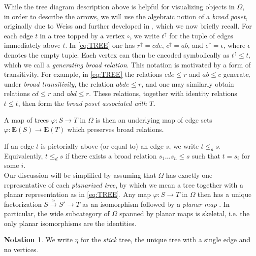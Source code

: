 \documentclass[a4paper,10pt]{article}%
\numberwithin{equation}{section}
\numberwithin{figure}{section}
\theoremstyle{definition} %
\newtheorem{notation}[equation]{Notation}%
\begin{document}
While the tree diagram description above is helpful for visualizing objects in $\Omega$,
in order to describe the arrows,
we will use the algebraic notion of
a \emph{broad poset},
originally due to Weiss \cite{Wei12}
and further developed in \cite{Per18},
which we now briefly recall.
%
For each edge $t$ in a tree topped by a vertex $\circ$, we write
$t^{\uparrow}$
for the tuple of edges immediately above $t$.
In \eqref{eq:TREE} one has  
$r^{\uparrow} = cde$, 
$c^\uparrow = ab$, 
and $e^\uparrow = \epsilon$,
where $\epsilon$ denotes the empty tuple.
Each vertex can then be encoded symbolically as
$t^{\uparrow} \leq t$,
which we call a 
\emph{generating broad relation}.
This notation is motivated by a form of transitivity.
For example,
in \eqref{eq:TREE}
the relations
$cde \leq r$ and $ab \leq c$
generate, under \emph{broad transitivity},
the relation $abde \leq r$,
and one may similarly obtain relations
$cd \leq r$ and $abd \leq r$.
These relations, together with identity relations $t \leq t$,
then form the \emph{broad poset associated with $T$}.


A map of trees $\varphi \colon S \to T$
in $\Omega$ is then an underlying map
of edge sets 
$\varphi \colon \boldsymbol{E}(S) \to \boldsymbol{E}(T)$
which preserves broad relations.

If an edge $t$ is pictorially above (or equal to) an edge $s$, we write $t \leq_d s$.
Equivalently, $t \leq_d s$ if there exists a broad relation $s_1\dots s_n \leq s$ such that $t = s_i$ for some $i$.\\

Our discussion will be simplified by assuming 
that $\Omega$ has exactly one representative of 
each \emph{planarized tree},
by which we mean a tree together with a planar representation as in \eqref{eq:TREE}.
Any map  
$\varphi \colon S \to T$ in $\Omega$
then has a unique factorization
$S \xrightarrow{\simeq} S' \to T$
as an isomorphism followed by a \emph{planar map}
\cite[Prop. 3.24]{BP_geo}.
In particular, the wide subcategory of $\Omega$ spanned by planar maps is skeletal,
i.e. the only planar isomorphisms are the identities.




\begin{notation}
	We write $\eta$ for the \textit{stick} tree, the unique tree with a single edge and no vertices.
\end{notation}
\end{document}
